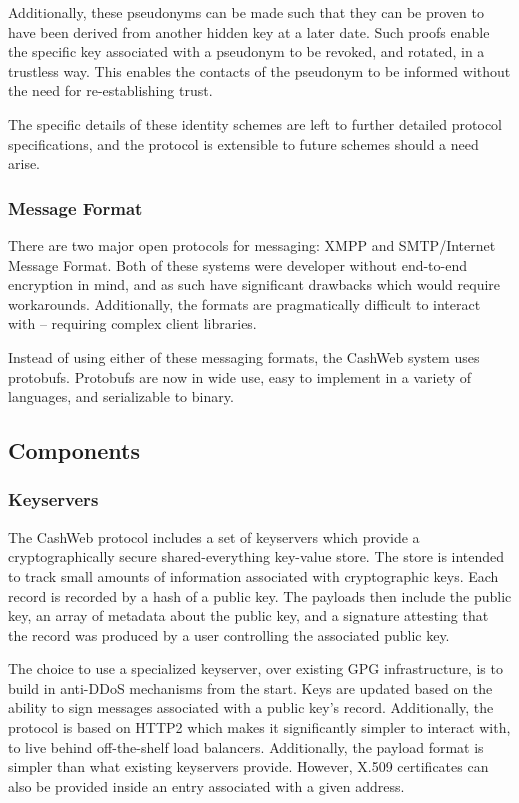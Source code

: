 \documentclass{article}
\theoremstyle{definition}
\begin{document}
Additionally, these pseudonyms can be made such that they can be proven to have been derived from another hidden key at a later date. Such proofs enable the specific key associated with a pseudonym to be revoked, and rotated, in a trustless way. This enables the contacts of the pseudonym to be informed without the need for re-establishing trust.

The specific details of these identity schemes are left to further detailed protocol specifications, and the protocol is extensible to future schemes should a need arise.

\subsubsection{Message Format}

There are two major open protocols for messaging: XMPP and SMTP/Internet Message Format. Both of these systems were developer without end-to-end encryption in mind, and as such have significant drawbacks which would require workarounds. Additionally, the formats are  pragmatically difficult to interact with -- requiring complex client libraries.

Instead of using either of these messaging formats, the CashWeb system uses protobufs. Protobufs are now in wide use, easy to implement in a variety of languages, and serializable to binary.

\subsection{Components}

\subsubsection{Keyservers}

The CashWeb protocol includes a set of keyservers which provide a cryptographically secure shared-everything key-value store. The store is intended to track small amounts of information associated with cryptographic keys. Each record is recorded by a hash of a public key. The payloads then include the public key, an array of metadata about the public key, and a signature attesting that the record was produced by a user controlling the associated public key.

The choice to use a specialized keyserver, over existing GPG infrastructure, is to build in anti-DDoS mechanisms from the start. Keys are updated based on the ability to sign messages associated with a public key's record. Additionally, the protocol is based on HTTP2 which makes it significantly simpler to interact with, to live behind off-the-shelf load balancers. Additionally, the payload format is simpler than what existing keyservers provide. However, X.509 certificates can also be provided inside an entry associated with a given address.
\end{document}
